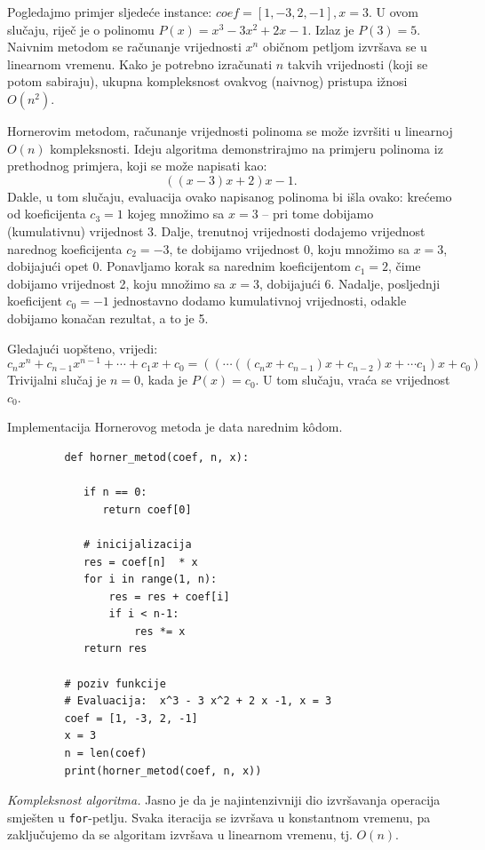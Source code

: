 \begin{solution}
	Pogledajmo primjer sljedeće instance: $coef = [1, -3, 2, -1], x = 3$. U ovom slučaju, riječ je o polinomu $P(x) =  x^3 - 3 x^2 + 2 x -1$. Izlaz    je $ P(3) = 5$.  \\
	
	Naivnim metodom se računanje vrijednosti $x^n$ običnom petljom izvršava se u linearnom vremenu. Kako je potrebno izračunati $n$ takvih vrijednosti  (koji se potom sabiraju), ukupna kompleksnost ovakvog (naivnog) pristupa ižnosi $O(n^2)$.
	
	 Hornerovim metodom, računanje vrijednosti polinoma se može izvršiti u linearnoj $O(n)$ kompleksnosti. Ideju algoritma demonstrirajmo na primjeru polinoma iz prethodnog primjera, koji se može napisati kao:  $$((x - 3)x + 2)x -1.$$ 
	 Dakle, u tom slučaju, evaluacija ovako napisanog polinoma bi išla ovako: krećemo od koeficijenta $c_3=1$ kojeg množimo sa $x=3$ -- pri tome dobijamo (kumulativnu) vrijednost 3. Dalje, trenutnoj vrijednosti   dodajemo vrijednost narednog koeficijenta $c_2 = -3$, te dobijamo vrijednost 0, koju množimo sa $x=3$, dobijajući opet 0. Ponavljamo korak sa narednim koeficijentom $c_1 = 2$, čime dobijamo vrijednost 2, koju množimo sa $x=3$, dobijajući 6. Nadalje, posljednji koeficijent $c_0=-1$ jednostavno dodamo kumulativnoj vrijednosti, odakle dobijamo konačan rezultat, a to je 5. 
	 
	 Gledajući uopšteno, vrijedi: 
	 $$ c_n x^n + c_{n-1}x^{n-1} + \cdots + c_1 x + c_0 = ((\cdots ((c_n x + c_{n-1})x + c_{n-2})x + \cdots c_1) x + c_0  )$$
	 Trivijalni slučaj je  $n=0$, kada je $P(x) = c_0$. U tom slučaju, vraća se vrijednost $ c_0$.
	 
	  
	 Implementacija Hornerovog metoda je data narednim k\^odom. 
	 
	 \begin{verbatim}
	 	 def horner_metod(coef, n, x):
	 	    
	 	    if n == 0: 
	 	       return coef[0]
	 	    
	 	 	# inicijalizacija
	 	 	res = coef[n]  * x
	 	 	for i in range(1, n):
	 	     	res = res + coef[i]
	 	     	if i < n-1:
	 	     		res *= x
	 	 	return res
	 	 
	 	 # poziv funkcije
	 	 # Evaluacija:  x^3 - 3 x^2 + 2 x -1, x = 3
	 	 coef = [1, -3, 2, -1]
	 	 x = 3
	 	 n = len(coef)
	 	 print(horner_metod(coef, n, x))
	 \end{verbatim}

\textit{Kompleksnost algoritma.}  Jasno je da je najintenzivniji dio izvršavanja operacija smješten u \texttt{for}-petlju. Svaka iteracija se izvršava u konstantnom vremenu, pa zaključujemo da se algoritam izvršava u linearnom vremenu, tj. $O(n)$.  
\end{solution}
 

